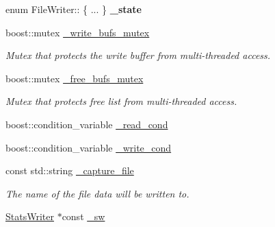\begin{DoxyCompactItemize}
\item 
\hypertarget{class_file_writer_aebfbd3e791e8dc53356c22932aa83d44}{
enum FileWriter:: \{ ... \}  {\bfseries \_\-state}}
\label{class_file_writer_aebfbd3e791e8dc53356c22932aa83d44}

\item 
\hypertarget{class_file_writer_a39285179310fa0e5424b9b53dd722f64}{
boost::mutex \hyperlink{class_file_writer_a39285179310fa0e5424b9b53dd722f64}{\_\-write\_\-bufs\_\-mutex}}
\label{class_file_writer_a39285179310fa0e5424b9b53dd722f64}

\begin{DoxyCompactList}\small\item\em Mutex that protects the write buffer from multi-\/threaded access. \end{DoxyCompactList}\item 
\hypertarget{class_file_writer_ac7364b6382201cccb01416a3db104ea5}{
boost::mutex \hyperlink{class_file_writer_ac7364b6382201cccb01416a3db104ea5}{\_\-free\_\-bufs\_\-mutex}}
\label{class_file_writer_ac7364b6382201cccb01416a3db104ea5}

\begin{DoxyCompactList}\small\item\em Mutex that protects free list from multi-\/threaded access. \end{DoxyCompactList}\item 
boost::condition\_\-variable \hyperlink{class_file_writer_a094970dbaba07c145b26b9fce12951e8}{\_\-read\_\-cond}
\item 
boost::condition\_\-variable \hyperlink{class_file_writer_af0d0e6ad7c4b2f7ce920540728fbcb20}{\_\-write\_\-cond}
\item 
\hypertarget{class_file_writer_ae9cb41b36aa8ba14a5ead1f1b08272a2}{
const std::string \hyperlink{class_file_writer_ae9cb41b36aa8ba14a5ead1f1b08272a2}{\_\-capture\_\-file}}
\label{class_file_writer_ae9cb41b36aa8ba14a5ead1f1b08272a2}

\begin{DoxyCompactList}\small\item\em The name of the file data will be written to. \end{DoxyCompactList}\item 
\hyperlink{class_stats_writer}{StatsWriter} $\ast$const \hyperlink{class_file_writer_a77bde646bee4389994613ae0663a13ca}{\_\-sw}
\end{DoxyCompactItemize}


